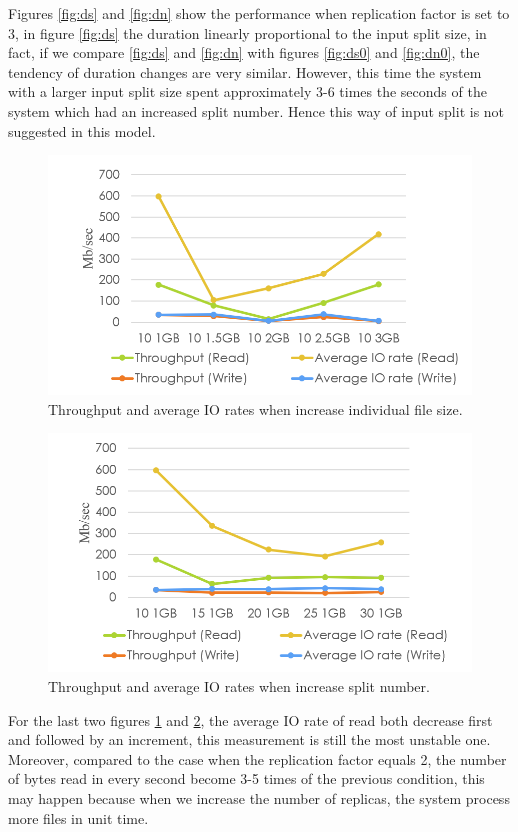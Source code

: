 \documentclass[11pt,twocolumn]{article}
\begin{document}
Figures \ref{fig:ds} and \ref{fig:dn} show the performance when replication factor is set to 3, in figure \ref{fig:ds} the duration linearly proportional to the input split size, in fact, if we compare \ref{fig:ds} and \ref{fig:dn} with figures \ref{fig:ds0} and \ref{fig:dn0}, the tendency of duration changes are very similar. However, this time the system with a larger input split size spent approximately 3-6 times the seconds of the system which had an increased split number. Hence this way of input split is not suggested in this model.
\begin{figure}[htp]
    \centering
        \includegraphics[width=\linewidth]{ts}
        \caption{Throughput and average IO rates when increase individual file size.}
        \label{fig:ts}
\end{figure}
\begin{figure}[htp]
    \centering
        \includegraphics[width=\linewidth]{tn}
        \caption{Throughput and average IO rates when increase split number.}
        \label{fig:tn}
\end{figure}

For the last two figures \ref{fig:ts} and \ref{fig:tn}, the average IO rate of read both decrease first and followed by an increment, this measurement is still the most unstable one. Moreover, compared to the case when the replication factor equals 2, the number of bytes read in every second become 3-5 times of the previous condition, this may happen because when we increase the number of replicas, the system process more files in unit time. 
\end{document}
